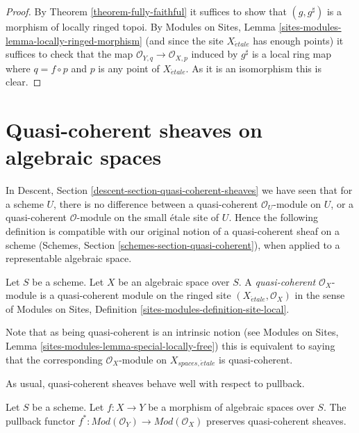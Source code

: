 \begin{proof}
By
Theorem \ref{theorem-fully-faithful}
it suffices to show that $(g, g^\sharp)$ is a morphism of
locally ringed topoi. By
Modules on Sites, Lemma \ref{sites-modules-lemma-locally-ringed-morphism}
(and since the site $X_{\acute{e}tale}$ has enough points)
it suffices to check that the map
$\mathcal{O}_{Y, q} \to \mathcal{O}_{X, p}$ induced by $g^\sharp$
is a local ring map where $q = f \circ p$ and $p$ is any point of
$X_{\acute{e}tale}$. As it is an isomorphism this is clear.
\end{proof}














\section{Quasi-coherent sheaves on algebraic spaces}
\label{section-quasi-coherent}

\noindent
In
Descent, Section \ref{descent-section-quasi-coherent-sheaves}
we have seen that for a scheme $U$, there is no difference between a
quasi-coherent $\mathcal{O}_U$-module on $U$, or a quasi-coherent
$\mathcal{O}$-module on the small \'etale site of $U$. Hence the following
definition is compatible with our original notion of a quasi-coherent sheaf
on a scheme
(Schemes, Section \ref{schemes-section-quasi-coherent}),
when applied to a representable algebraic space.

\begin{definition}
\label{definition-quasi-coherent}
Let $S$ be a scheme. Let $X$ be an algebraic space over $S$.
A {\it quasi-coherent} $\mathcal{O}_X$-module 
is a quasi-coherent module on the ringed site
$(X_{\acute{e}tale}, \mathcal{O}_X)$ in the sense of
Modules on Sites,
Definition \ref{sites-modules-definition-site-local}.
\end{definition}

\noindent
Note that as being quasi-coherent is an intrinsic notion (see
Modules on Sites, Lemma \ref{sites-modules-lemma-special-locally-free})
this is equivalent to saying that the corresponding $\mathcal{O}_X$-module
on $X_{spaces, \acute{e}tale}$ is quasi-coherent.

\medskip\noindent
As usual, quasi-coherent sheaves behave well with respect to pullback.

\begin{lemma}
\label{lemma-pullback-quasi-coherent}
Let $S$ be a scheme.
Let $f : X \to Y$ be a morphism of algebraic spaces over $S$.
The pullback functor
$f^* : \textit{Mod}(\mathcal{O}_Y) \to \textit{Mod}(\mathcal{O}_X)$
preserves quasi-coherent sheaves.
\end{lemma}

